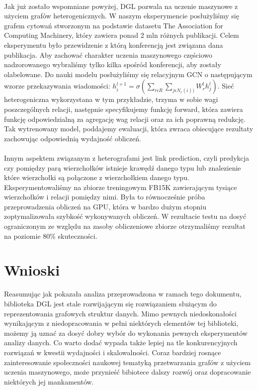 \documentclass{article}
\begin{document}
\paragraph{}
Jak już zostało wspomniane powyżej, DGL pozwala na uczenie maszynowe z użyciem grafów heterogenicznych. W naszym eksperymencie posłużyliśmy się grafem cytowań stworzonym na podstawie datasetu The Association for Computing Machinery, który zawiera ponad 2 mln różnych publikacji. Celem eksperymentu było przewidzenie z którą konferencją jest związana dana publikacja. Aby zachować charakter uczenia maszynowego częściowo nadzorowanego wybraliśmy tylko kilka spośród konferencji, aby zostały olabelowane. Do nauki modelu posłużyliśmy się relacyjnym GCN o następującym wzorze przekazywania wiadomości: $ h_{i}^{l+1} = \sigma (\sum_{r \epsilon R}\sum_{j \epsilon N_{r}(i))} W
_{r}^{l}h_{j}^{l}) $. Sieć heterogeniczna wykorzystana w tym przykładzie, trzyma w sobie wagi poszczególnych relacji, następnie specyfikujemy funkcję forward, która zawiera funkcję odpowiedzialną za agregację wag relacji oraz za ich poprawną redukcję. Tak wytrenowany model, poddajemy ewaluacji, która zwraca obiecujące rezultaty zachowując odpowiednią wydajność obliczeń. 

\paragraph{}
Innym aspektem związanym z heterografami jest link prediction, czyli predykcja czy pomiędzy parą wierzchołków istnieje krawędź danego typu lub znalezienie które wierzchołki są połączone z wierzchołkiem danego typu. Eksperymentowaliśmy na zbiorze treningowym FB15K zawierającym tysiące wierzchołków i relacji pomiędzy nimi. Była to równocześnie próba przeprowadzenia obliczeń na GPU, która w bardzo dużym stopniu zoptymalizowała szybkość wykonywanych obliczeń. W rezultacie testu na dosyć ograniczonym ze względu na zasoby obliczeniowe zbiorze otrzymaliśmy rezultat na poziomie 80\% skuteczności.  

\section{Wnioski}
\label{sec:conclusions}
Reasumując jak pokazała analiza przeprowadzona w ramach tego dokumentu, biblioteka DGL jest stale rozwijającym się rozwiązaniem służącym do reprezentowania grafowych struktur danych. Mimo pewnych niedoskonałości wynikającym z niedopracowania w pełni niektórych elementów tej biblioteki, możemy ją uznać za dosyć dobry wybór do wykonania pewnych eksperymentów analizy danych. Co warto dodać wypada także lepiej na tle konkurencyjnych rozwiązań w kwestii wydajności i skalowalności. Coraz bardziej rosnące zainteresowanie społeczności naukowej tematyką przetwarzania grafów z użyciem uczenia maszynowego, może przynieść bibiotece dalszy rozwój oraz dopracowanie niektórych jej mankamentów. 
\end{document}
